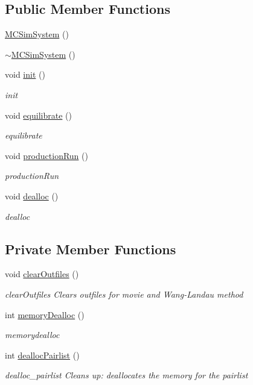 \subsection*{Public Member Functions}
\begin{DoxyCompactItemize}
\item 
\hyperlink{class_m_c_sim_system_ace11df1bb6f80f7654aa088870aa7271}{M\+C\+Sim\+System} ()
\item 
\hyperlink{class_m_c_sim_system_a6dd3f00bcb990de568515dcd65d26624}{$\sim$\+M\+C\+Sim\+System} ()
\item 
void \hyperlink{class_m_c_sim_system_adfacc1a896841b090ebab26fd369f43a}{init} ()
\begin{DoxyCompactList}\small\item\em init \end{DoxyCompactList}\item 
void \hyperlink{class_m_c_sim_system_a4f11a2356f82dba787e1a4d69e0e0d4f}{equilibrate} ()
\begin{DoxyCompactList}\small\item\em equilibrate \end{DoxyCompactList}\item 
void \hyperlink{class_m_c_sim_system_a188410921d582e9a2659627f4ca2073b}{production\+Run} ()
\begin{DoxyCompactList}\small\item\em production\+Run \end{DoxyCompactList}\item 
void \hyperlink{class_m_c_sim_system_a5886c6bfb00df9e66bf659673cd03854}{dealloc} ()
\begin{DoxyCompactList}\small\item\em dealloc \end{DoxyCompactList}\end{DoxyCompactItemize}
\subsection*{Private Member Functions}
\begin{DoxyCompactItemize}
\item 
void \hyperlink{class_m_c_sim_system_a6bf0bdd480a14c93b53177e32d502295}{clear\+Outfiles} ()
\begin{DoxyCompactList}\small\item\em clear\+Outfiles Clears outfiles for movie and Wang-\/\+Landau method \end{DoxyCompactList}\item 
int \hyperlink{class_m_c_sim_system_a780a1180f5bbe06b66ec672802f0a7b9}{memory\+Dealloc} ()
\begin{DoxyCompactList}\small\item\em memorydealloc \end{DoxyCompactList}\item 
int \hyperlink{class_m_c_sim_system_a5a4cc59839d79f6712f25bea5c5696d2}{dealloc\+Pairlist} ()
\begin{DoxyCompactList}\small\item\em dealloc\+\_\+pairlist Cleans up\+: deallocates the memory for the pairlist \end{DoxyCompactList}\end{DoxyCompactItemize}
